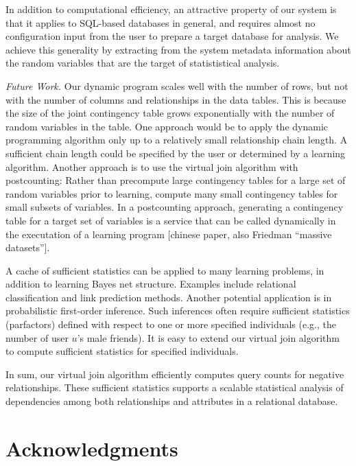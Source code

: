 \documentclass{vldb}
\begin{document}
In addition to computational efficiency, an attractive property of our system is that it applies to SQL-based databases in general, and requires almost no configuration input from the  user to prepare a target database for analysis. We achieve this generality by extracting from the system metadata information about the random variables that are the target of statististical analysis.  


\emph{Future Work.} Our dynamic program scales well with the number of rows, but not with the number of columns and relationships in the data tables. This is because the size of the joint contingency table grows exponentially with the number of random variables in the table. One approach would be to apply the dynamic programming algorithm only  up to a relatively small relationship chain length. A sufficient chain length could be specified by the user or determined by a learning algorithm. Another approach is to use the virtual join algorithm with postcounting: Rather than precompute large contingency tables for a large set of random variables prior to learning, compute many small contingency tables for  small subsets of variables. In a postcounting approach, generating a contingency table for a target set of variables is a service that can be called dynamically in the executation of a learning program  [chinese paper, also Friedman ``massive datasets'']. 

A cache of sufficient statistics can be applied to many learning problems, in addition to learning Bayes net structure. Examples include relational classification and link prediction methods. Another potential application is in probabilistic first-order inference. Such inferences often require sufficient statistics (parfactors) defined with respect to one or more specified individuals (e.g., the number of user $u$'s male friends). It is easy to extend our virtual join algorithm to compute sufficient statistics for specified individuals. 

In sum, our virtual join algorithm efficiently computes query counts for negative relationships. These sufficient statistics supports a scalable statistical analysis of  dependencies among both relationships and attributes in a relational database.



\section{Acknowledgments}
\end{document}
